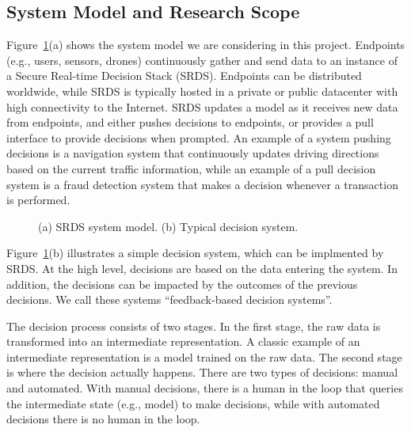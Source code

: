 \subsection{System Model and Research Scope}

Figure~\ref{figure:model-and-decision}(a) shows the system model we are considering in this project. Endpoints (e.g., users, sensors, drones)  continuously gather and send data to an instance of a Secure Real-time Decision Stack (SRDS). Endpoints can be distributed worldwide, while SRDS is typically hosted in a private or public datacenter with high connectivity to the Internet. SRDS updates a model as it receives new data from endpoints, and either pushes decisions to endpoints, or provides a pull interface to provide decisions when prompted. An example of a system pushing decisions is a navigation system that continuously updates driving directions based on the current traffic information, while an example of a pull decision system  is a fraud detection system that makes a decision whenever a transaction is performed.

\0
\begin{figure}[h]
 \caption{\small{(a) SRDS system model. (b) Typical decision system.}}
  \label{figure:model-and-decision}
\end{figure}

Figure~\ref{figure:model-and-decision}(b) illustrates a simple decision system, which can be implmented by SRDS. At the high level, decisions are based on the data entering the system. In addition, the decisions can be impacted by the outcomes of the previous decisions. We call these systems ``feedback-based decision systems''.

The decision process consists of two stages. In the first stage, the raw data is transformed into an intermediate representation. A classic example of an intermediate representation is a model trained on the raw data. The second stage is where the decision actually happens. There are two types of decisions: manual and automated. With manual decisions, there is a human in the loop that queries the intermediate state (e.g., model) to make decisions, while with automated decisions there is no human in the loop.

